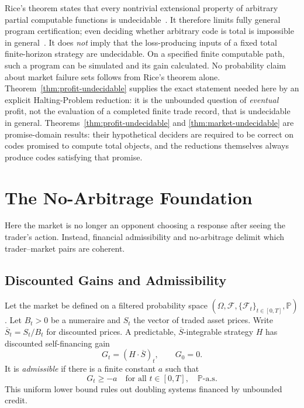 \documentclass[aps,pra,reprint,superscriptaddress,amsmath,amssymb,floatfix]{revtex4-2}
\theoremstyle{plain}
\theoremstyle{definition}
\theoremstyle{remark}
\begin{document}
Rice's theorem states that every nontrivial extensional property of arbitrary
partial computable functions is undecidable~\cite{Rice-1953}. It therefore
limits fully general program certification; even deciding whether arbitrary
code is total is impossible in general~\cite{turing-36}. It does \emph{not}
imply that the loss-producing inputs of a fixed total finite-horizon strategy
are undecidable. On a specified finite computable path, such a program can be
simulated and its gain calculated. No probability claim about market failure
sets follows from Rice's theorem alone. Theorem~\ref{thm:profit-undecidable}
supplies the exact statement needed here by an explicit Halting-Problem
reduction: it is the unbounded question of \emph{eventual} profit, not the
evaluation of a completed finite trade record, that is undecidable in general.
Theorems~\ref{thm:profit-undecidable} and
\ref{thm:market-undecidable} are promise-domain results: their hypothetical
deciders are required to be correct on codes promised to compute total
objects, and the reductions themselves always produce codes satisfying that
promise.

\section{The No-Arbitrage Foundation}
\label{sec:noarb}

Here the market is no longer an opponent choosing a response after seeing the
trader's action. Instead, financial admissibility and no-arbitrage delimit
which trader--market pairs are coherent.

\subsection{Discounted Gains and Admissibility}

Let the market be defined on a filtered probability space
\((\Omega,\mathcal{F},\{\mathcal{F}_t\}_{t\in[0,T]},\mathbb{P})\).
Let \(B_t>0\) be a numeraire and \(S_t\) the vector of traded asset prices.
Write \(\overline S_t=S_t/B_t\) for discounted prices. A predictable,
\(\overline S\)-integrable strategy \(H\) has discounted self-financing gain
\begin{equation}
  G_t=(H\mathbin{\cdot}\overline S)_t,\qquad G_0=0.
  \label{eq:gain}
\end{equation}
It is \emph{admissible} if there is a finite constant \(a\) such that
\begin{equation}
  G_t\geq -a\quad\text{for all }t\in[0,T],\quad\mathbb{P}\text{-a.s.}
  \label{eq:admissible}
\end{equation}
This uniform lower bound rules out doubling systems financed by unbounded
credit.
\end{document}
